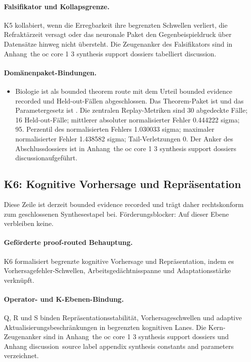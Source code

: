 \paragraph{Falsifikator und Kollapsgrenze.}
K5 kollabiert, wenn die Erregbarkeit ihre begrenzten Schwellen verliert, die Refraktärzeit versagt oder das neuronale Paket den Gegenbeispieldruck über Datensätze hinweg nicht übersteht.
Die Zeugenanker des Falsifikators sind in Anhang~the oc core 1 3 synthesis support dossiers tabelliert discussion.

\paragraph{Domänenpaket-Bindungen.}
\begin{itemize}[leftmargin=1.6em,nosep]
\item Biologie ist als bounded theorem route mit dem Urteil bounded evidence recorded und  Held-out-Fällen abgeschlossen. Das Theorem-Paket ist  und das Parametergesetz ist . Die zentralen Replay-Metriken sind 30 abgedeckte Fälle; 16 Held-out-Fälle; mittlerer absoluter normalisierter Fehler 0.444222 sigma; 95. Perzentil des normalisierten Fehlers 1.030033 sigma; maximaler normalisierter Fehler 1.438582 sigma; Tail-Verletzungen 0. Der Anker des Abschlussdossiers ist in Anhang~the oc core 1 3 synthesis support dossiers discussionaufgeführt.
\end{itemize}

\subsection{K6: Kognitive Vorhersage und Repräsentation}
\label{sec:oc-core-1-3-synthesis-k6}
Diese Zeile ist derzeit bounded evidence recorded und trägt daher rechtskonform zum geschlossenen Synthesestapel bei.
Förderungsblocker: Auf dieser Ebene verbleiben keine.

\paragraph{Geförderte proof-routed Behauptung.}
K6 formalisiert begrenzte kognitive Vorhersage und Repräsentation, indem es Vorhersagefehler-Schwellen, Arbeitsgedächtnisspanne und Adaptationsstärke verknüpft.

\paragraph{Operator- und K-Ebenen-Bindung.}
Q, R und S binden Repräsentationsstabilität, Vorhersageschwellen und adaptive Aktualisierungsbeschränkungen in begrenzten kognitiven Lanes.
Die Kern-Zeugenanker sind in Anhang~the oc core 1 3 synthesis support dossiers und Anhang discussion~source label appendix synthesis constants and parameters verzeichnet.

